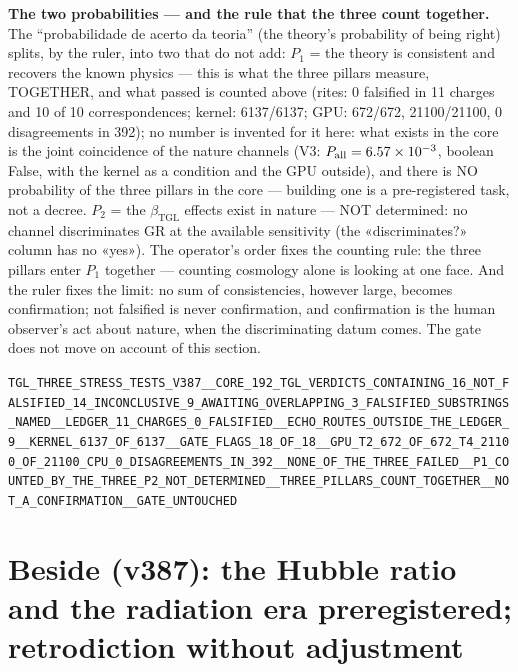 \documentclass[11pt]{article}
\newcommand{\bTGL}{\beta_{\mathrm{TGL}}}\newcommand{\Msun}{M_{\odot}}\newcommand{\TGL}{\mathrm{TGL}}
\theoremstyle{definition}\newtheorem{deriv}{Derivation}
\begin{document}
\textbf{The two probabilities --- and the rule that the three count together.} The ``probabilidade de acerto da teoria'' (the theory's probability of being right) splits, by the ruler, into two that do not add: $P_1$ = the theory is consistent and recovers the known physics --- this is what the three pillars measure, TOGETHER, and what passed is counted above (rites: 0 falsified in 11 charges and 10 of 10 correspondences; kernel: 6137/6137; GPU: 672/672, 21100/21100, 0 disagreements in 392); no number is invented for it here: what exists in the core is the joint coincidence of the nature channels (V3: $P_{\rm all}=6.57\times10^{-3}$, boolean False, with the kernel as a condition and the GPU outside), and there is NO probability of the three pillars in the core --- building one is a pre-registered task, not a decree. $P_2$ = the $\bTGL$ effects exist in nature --- NOT determined: no channel discriminates GR at the available sensitivity (the «discriminates?» column has no «yes»). The operator's order fixes the counting rule: the three pillars enter $P_1$ together --- counting cosmology alone is looking at one face. And the ruler fixes the limit: no sum of consistencies, however large, becomes confirmation; not falsified is never confirmation, and confirmation is the human observer's act about nature, when the discriminating datum comes. The gate does not move on account of this section.

\begin{center}\small\texttt{TGL\_THREE\_STRESS\_TESTS\_V387\_\_CORE\_192\_TGL\_VERDICTS\_CONTAINING\_16\_NOT\_FALSIFIED\_14\_INCONCLUSIVE\_9\_AWAITING\_OVERLAPPING\_3\_FALSIFIED\_SUBSTRINGS\_NAMED\_\_LEDGER\_11\_CHARGES\_0\_FALSIFIED\_\_ECHO\_ROUTES\_OUTSIDE\_THE\_LEDGER\_9\_\_KERNEL\_6137\_OF\_6137\_\_GATE\_FLAGS\_18\_OF\_18\_\_GPU\_T2\_672\_OF\_672\_T4\_21100\_OF\_21100\_CPU\_0\_DISAGREEMENTS\_IN\_392\_\_NONE\_OF\_THE\_THREE\_FAILED\_\_P1\_COUNTED\_BY\_THE\_THREE\_P2\_NOT\_DETERMINED\_\_THREE\_PILLARS\_COUNT\_TOGETHER\_\_NOT\_A\_CONFIRMATION\_\_GATE\_UNTOUCHED}\end{center}

\section*{Beside (v387): the Hubble ratio and the radiation era preregistered; retrodiction without adjustment}

\end{document}
